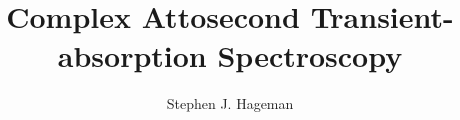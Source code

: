 \documentclass[11pt, double , phd]{osudiss-2}
\title{Complex Attosecond Transient-absorption Spectroscopy}
\author{Stephen J. Hageman}
\newcommand\PrintListofAbbreviations[1]{
\phantomsection
\addcontentsline{toc}{front}{\typesetColumnHeading{#1}}
\printglossary[type=\acronymtype,title={\protect {\typesetLevelTwo{#1}}}]
}
\begin{document}
\showthe\textwidth
\frontmatter


\dedication{Dedicated to Jarrett J. Hill} %


\tableofcontents 

\clearpage %
\listoffigures 

\clearpage  %
\listoftables 


\mainmatter
%







%	
%	
%
%

\backmatter






%
%
\end{document}
